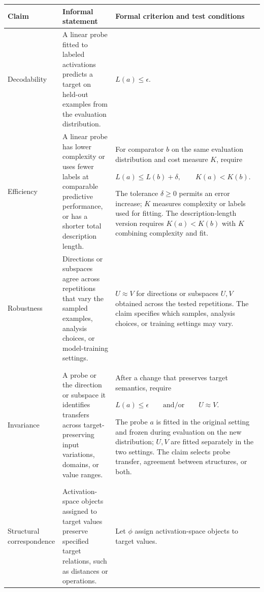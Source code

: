 \documentclass[11pt]{article}
\begin{document}
\begin{table}[H]
\centering
\small
\setlength{\tabcolsep}{5pt}
\renewcommand{\arraystretch}{1.00}
\begin{tabularx}{\textwidth}{@{}>{\raggedright\arraybackslash}p{22mm}>{\raggedright\arraybackslash}p{48mm}>{\raggedright\arraybackslash}X@{}}
\toprule
\textbf{Claim} & \textbf{Informal statement} & \textbf{Formal criterion and test conditions} \\
\midrule
Decodability & A linear probe fitted to labeled activations predicts a target on held-out examples from the evaluation distribution.
& $\displaystyle L(a)\leq\epsilon$. \\
\addlinespace[1.5pt]
Efficiency & A linear probe has lower complexity or uses fewer labels at comparable predictive performance, or has a shorter total description length.
& For comparator $b$ on the same evaluation distribution and cost measure $K$, require
\par $\displaystyle L(a)\leq L(b)+\delta,\qquad K(a)<K(b)$.
\par The tolerance $\delta\geq0$ permits an error increase; $K$ measures complexity or labels used for fitting.
The description-length version requires $K(a)<K(b)$ with $K$ combining complexity and fit. \\
\addlinespace[1.5pt]
Robustness & Directions or subspaces agree across repetitions that vary the sampled examples, analysis choices, or model-training settings.
& $\displaystyle U\approx V$ for directions or subspaces $U,V$ obtained across the tested repetitions.
The claim specifies which samples, analysis choices, or training settings may vary. \\
\addlinespace[1.5pt]
Invariance & A probe or the direction or subspace it identifies transfers across target-preserving input variations, domains, or value ranges.
& After a change that preserves target semantics, require
\par $\displaystyle L(a)\leq\epsilon\qquad\text{and/or}\qquad U\approx V$.
\par The probe $a$ is fitted in the original setting and frozen during evaluation on the new distribution; $U,V$ are fitted separately in the two settings.
The claim selects probe transfer, agreement between structures, or both. \\
\addlinespace[1.5pt]
Structural correspondence & Activation-space objects assigned to target values preserve specified target relations, such as distances or operations.
& Let $\phi$ assign activation-space objects to target values.

\end{tabularx}
\end{table}
\end{document}
